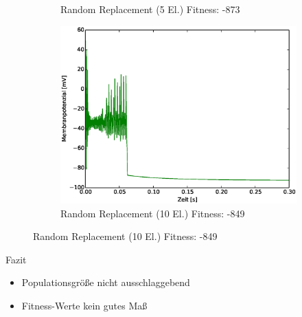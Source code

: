 \begin{frame}
\begin{figure}
\begin{subfigure}{.5\textwidth}
      \caption*{\scriptsize{Random Replacement (5 El.)} \tiny{Fitness: -873}}
    \end{subfigure}%
    \begin{subfigure}{.5\textwidth}
      \centering
      \includegraphics*[viewport=19 10 532 394,width=0.7\linewidth]{genetic/ch-rand-repl10.eps}
      \caption*{\scriptsize{Random Replacement (10 El.)} \tiny{Fitness: -849}}
    \end{subfigure}
  \end{figure}
\end{frame}

\begin{frame}
  Fazit
  \begin{itemize}
    \item{Populationsgröße nicht ausschlaggebend}
    \item{Fitness-Werte kein gutes Maß}
  \end{itemize}
  
\end{frame}